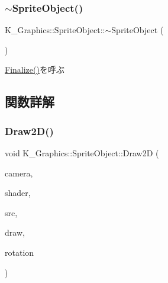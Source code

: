 \mbox{\label{class_k___graphics_1_1_sprite_object_a8df242841b57bc345eb790b1fd24dbb9}} 
\subsubsection{\texorpdfstring{$\sim$\+Sprite\+Object()}{~SpriteObject()}}
{\footnotesize\ttfamily K\+\_\+\+Graphics\+::\+Sprite\+Object\+::$\sim$\+Sprite\+Object (\begin{DoxyParamCaption}{ }\end{DoxyParamCaption})}



\mbox{\hyperlink{class_k___graphics_1_1_sprite_object_ab07a1bdede7da183545bd155193d9f80}{Finalize()}}を呼ぶ 



\subsection{関数詳解}
\mbox{\label{class_k___graphics_1_1_sprite_object_a1d9eb5352fd073b17ea42b53786fa29a}} 
\subsubsection{\texorpdfstring{Draw2\+D()}{Draw2D()}}
{\footnotesize\ttfamily void K\+\_\+\+Graphics\+::\+Sprite\+Object\+::\+Draw2D (\begin{DoxyParamCaption}\item[{\mbox{\hyperlink{class_k___graphics_1_1_camera_class}{Camera\+Class}} $\ast$}]{camera,  }\item[{\mbox{\hyperlink{class_k___graphics_1_1_shader_class}{Shader\+Class}} $\ast$}]{shader,  }\item[{const \mbox{\hyperlink{struct_k___math_1_1_box2_d}{K\+\_\+\+Math\+::\+Box2D}} \&}]{src,  }\item[{const \mbox{\hyperlink{struct_k___math_1_1_box2_d}{K\+\_\+\+Math\+::\+Box2D}} \&}]{draw,  }\item[{float}]{rotation }\end{DoxyParamCaption})}




